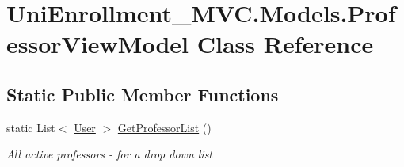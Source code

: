 \hypertarget{class_uni_enrollment___m_v_c_1_1_models_1_1_professor_view_model}{}\section{Uni\+Enrollment\+\_\+\+M\+V\+C.\+Models.\+Professor\+View\+Model Class Reference}
\label{class_uni_enrollment___m_v_c_1_1_models_1_1_professor_view_model}
\subsection*{Static Public Member Functions}
\begin{DoxyCompactItemize}
\item 
static List$<$ \hyperlink{class_uni_enrollment___m_v_c_1_1_models_1_1_user}{User} $>$ \hyperlink{class_uni_enrollment___m_v_c_1_1_models_1_1_professor_view_model_a2a3825e5981ac5301bba4e850e0e56b7}{Get\+Professor\+List} ()
\begin{DoxyCompactList}\small\item\em All active professors -\/ for a drop down list \end{DoxyCompactList}\end{DoxyCompactItemize}
